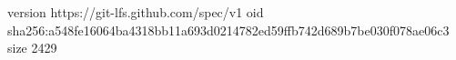 version https://git-lfs.github.com/spec/v1
oid sha256:a548fe16064ba4318bb11a693d0214782ed59ffb742d689b7be030f078ae06c3
size 2429
